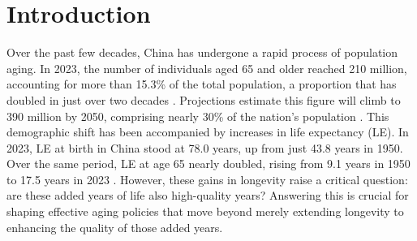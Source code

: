 \documentclass[12pt, a4paper]{article}
\begin{document}

\newpage
\section{Introduction}
Over the past few decades, China has undergone a rapid process of population aging. In 2023, the number of individuals aged 65 and older reached 210 million, accounting for more than 15.3\% of the total population, a proportion that has doubled in just over two decades \autocite{nationalbureauofstatisticsofchina.2023.china}. Projections estimate this figure will climb to 390 million by 2050, comprising nearly 30\% of the nation's population \autocite{unitednations.2024.world}.  This demographic shift has been accompanied by increases in life expectancy (LE). In 2023, LE at birth in China stood at 78.0 years, up from just 43.8 years in 1950. Over the same period, LE at age 65 nearly doubled, rising from 9.1 years in 1950 to 17.5 years in 2023 \autocite{unitednations.2024.world}. However, these gains in longevity raise a critical question: are these added years of life also high-quality years? Answering this is crucial for shaping effective aging policies that move beyond merely extending longevity to enhancing the quality of those added years.
\end{document}
